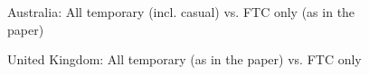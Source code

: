 \begin{figure}
    \caption{Australia: All temporary (incl. casual) vs. FTC only (as in the paper)}
    \label{graph_sensitivity_AU}
\end{figure}


\begin{figure}
    \caption{United Kingdom: All temporary (as in the paper) vs. FTC only}
    \label{graph_sensitivity_UK}
\end{figure}

